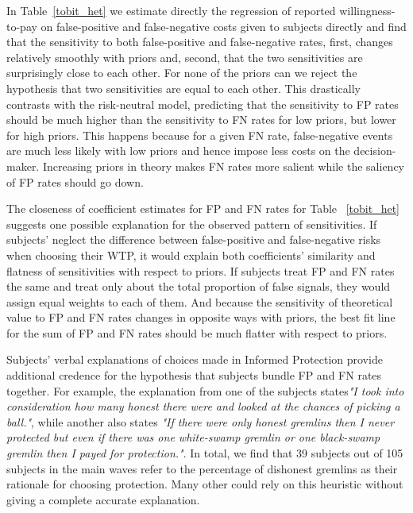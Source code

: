 \documentclass[12pt,a4paper]{article}
\begin{document}
\label{tobit_het}

In Table~\ref{tobit_het} we estimate directly the regression of reported willingness-to-pay on false-positive and false-negative costs given to subjects directly and find that the sensitivity to both false-positive and false-negative rates, first, changes relatively smoothly with priors and, second, that the two sensitivities are surprisingly close to each other. For none of the priors can we reject the hypothesis that two sensitivities are equal to each other. This drastically contrasts with the risk-neutral model, predicting that the sensitivity to FP rates should be much higher than the sensitivity to FN rates for low priors, but lower for high priors. This happens because for a given FN rate, false-negative events are much less likely with low priors and hence impose less costs on the decision-maker. Increasing priors in theory makes FN rates more salient while the saliency of FP rates should go down. 

The closeness of coefficient estimates for FP and FN rates for Table ~\ref{tobit_het} suggests one possible explanation for the observed pattern of sensitivities. If subjects' neglect the difference between false-positive and false-negative risks when choosing their WTP, it would explain both coefficients' similarity and flatness of sensitivities with respect to priors. If subjects treat FP and FN rates the same and treat only about the total proportion of false signals, they would assign equal weights to each of them. And because the sensitivity of theoretical value to FP and FN rates changes in opposite ways with priors, the best fit line for the sum of FP and FN rates should be much flatter with respect to priors.

Subjects' verbal explanations of choices made in Informed Protection provide additional credence for the hypothesis that subjects bundle FP and FN rates together. For example, the explanation from one of the subjects states\textit{"I took into consideration how many honest there were and looked at the chances of picking a ball."}, while another also states \textit{"If there were only honest gremlins then I never protected but even if there was one white-swamp gremlin or one black-swamp gremlin then I payed for protection."}. In total, we find that 39 subjects out of 105 subjects in the main waves refer to the percentage of dishonest gremlins as their rationale for choosing protection. Many other could rely on this heuristic without giving a complete accurate explanation.
\end{document}
